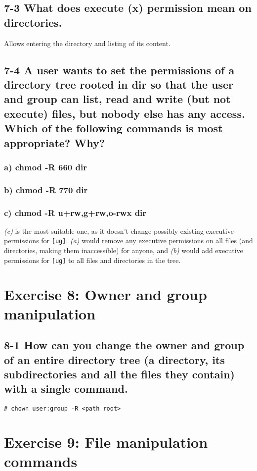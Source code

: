 \subsection{7-3 What does execute (x) permission mean on directories.}
Allows entering the directory and listing of its content.

\subsection{7-4 A user wants to set the permissions of a directory tree rooted in dir so that the user and group can list, read and write (but not execute) files, but nobody else has any access. Which of the following commands is most appropriate? Why?}

\subsubsection{a) chmod -R 660 dir}

\subsubsection{b) chmod -R 770 dir}

\subsubsection{c) chmod -R u+rw,g+rw,o-rwx dir}

\emph{(c)} is the most suitable one, as it doesn't change possibly existing executive permissions for \verb=[ug]=. \emph{(a)} would remove any executive permissions on all files (and directories, making them inaccessible) for anyone, and \emph{(b)} would add executive permissions for \verb=[ug]= to all files and directories in the tree.


\section{Exercise 8: Owner and group manipulation}
\subsection{8-1 How can you change the owner and group of an entire directory tree (a directory, its subdirectories and all the files they contain) with a single command.}
\verb=# chown user:group -R <path root>=

\section{Exercise 9: File manipulation commands}
